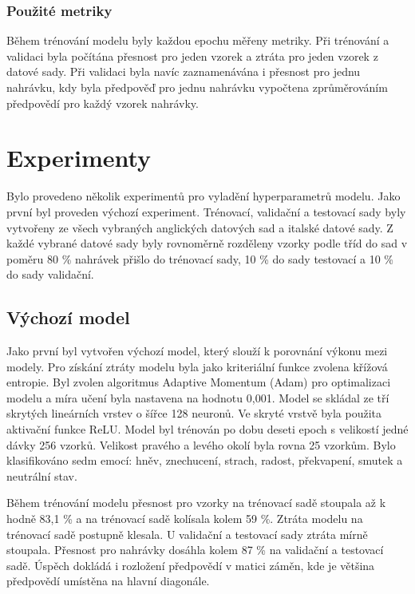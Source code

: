 \documentclass[FM,BP]{tulthesis}
\begin{document}
\subsection{Použité metriky}
Během trénování modelu byly každou epochu měřeny metriky. Při trénování a validaci byla počítána přesnost pro jeden vzorek a ztráta pro jeden vzorek z datové sady. Při validaci byla navíc zaznamenávána i přesnost pro jednu nahrávku, kdy byla předpověď pro jednu nahrávku vypočtena zprůměrováním předpovědí pro každý vzorek nahrávky.

\chapter{Experimenty} %
Bylo provedeno několik experimentů pro vyladění hyperparametrů modelu. Jako první byl proveden výchozí experiment. Trénovací, validační a testovací sady byly vytvořeny ze všech vybraných anglických datových sad a italské datové sady. Z každé vybrané datové sady byly rovnoměrně rozděleny vzorky podle tříd do sad v poměru 80 \% nahrávek přišlo do trénovací sady, 10 \% do sady testovací a 10 \% do sady validační.

\section{Výchozí model}
Jako první byl vytvořen výchozí model, který slouží k porovnání výkonu mezi modely. Pro získání ztráty modelu byla jako kriteriální funkce zvolena křížová entropie. Byl zvolen algoritmus Adaptive Momentum (Adam) pro optimalizaci modelu a míra učení byla nastavena na hodnotu 0,001. Model se skládal ze tří skrytých lineárních vrstev o šířce 128 neuronů. Ve skryté vrstvě byla použita aktivační funkce ReLU. Model byl trénován po dobu deseti epoch s velikostí jedné dávky 256 vzorků. Velikost pravého a levého okolí byla rovna 25 vzorkům. Bylo klasifikováno sedm emocí: hněv, znechucení, strach, radost, překvapení, smutek a neutrální stav.

Během trénování modelu přesnost pro vzorky na trénovací sadě stoupala až k hodně 83,1 \% a na trénovací sadě kolísala kolem 59 \%. Ztráta modelu na trénovací sadě postupně klesala. U validační a testovací sady ztráta mírně stoupala. Přesnost pro nahrávky dosáhla kolem 87 \% na validační a testovací sadě. Úspěch dokládá i rozložení předpovědí v matici záměn, kde je většina předpovědí umístěna na hlavní diagonále.
\end{document}
